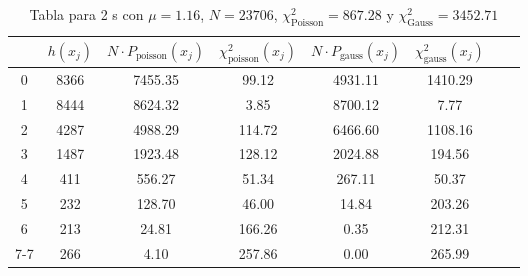 \begin{center}
\begin{table}[H]
\caption{Tabla para 2 s con $\mu=1.16$, $N=23706$, $\chi^2_{\text{Poisson}}=867.28$  y $\chi^2_{\text{Gauss}}=3452.71$}
\label{Tab:histo_m_2s}
\begin{tabular}{cccccccc}
\toprule
 & $h(x_j)$ & $N \cdot P_{\text{poisson}} (x_j)$ & $\chi^2_{\text{poisson}}(x_j)$ & $N \cdot P_{\text{gauss}} (x_j)$ & $\chi^2_{\text{gauss}}(x_j)$ \\
\midrule
0 & \num{ 8366} & \num{7455.35} & \num{99.12} & \num{4931.11} & \num{1410.29} \\
1 & \num{ 8444} & \num{8624.32} & \num{3.85} & \num{8700.12} & \num{7.77} \\
2 & \num{ 4287} & \num{4988.29} & \num{114.72} & \num{6466.60} & \num{1108.16} \\
3 & \num{ 1487} & \num{1923.48} & \num{128.12} & \num{2024.88} & \num{194.56} \\
4 & \num{  411} & \num{556.27} & \num{51.34} & \num{267.11} & \num{50.37} \\
5 & \num{  232} & \num{128.70} & \num{46.00} & \num{14.84} & \num{203.26} \\
6 & \num{  213} & \num{24.81} & \num{166.26} & \num{0.35} & \num{212.31} \\
7-7 & \num{  266} & \num{4.10} & \num{257.86} & \num{0.00} & \num{265.99} \\
\bottomrule
\end{tabular}
\end{table}
\end{center}
